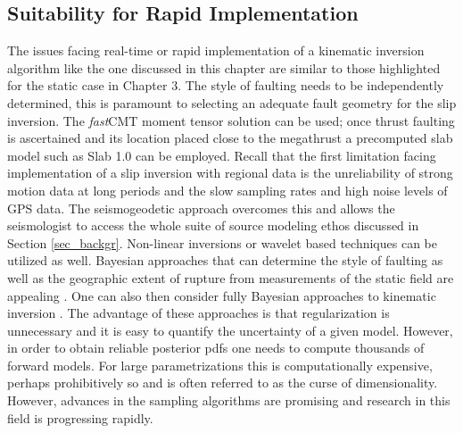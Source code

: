 \subsection{Suitability for Rapid Implementation}

The issues facing real-time or rapid implementation of a kinematic inversion algorithm like the one discussed in this chapter are similar to those highlighted for the static case in Chapter 3. The style of faulting needs to be independently determined, this is paramount to selecting an adequate fault geometry for the slip inversion. The \textit{fast}CMT moment tensor solution can be used; once thrust faulting is ascertained and its location placed close to the megathrust a precomputed slab model such as Slab 1.0 \citep{hayes2012} can be employed. Recall that the first limitation facing implementation of a slip inversion with regional data is the unreliability of strong motion data at long periods and the slow sampling rates and high noise levels of GPS data. The seismogeodetic approach overcomes this and allows the seismologist to access the whole suite of source modeling ethos discussed in Section \ref{sec_backgr}. Non-linear inversions or wavelet based techniques can be utilized as well. Bayesian approaches that can determine the style of faulting as well as the geographic extent of rupture from measurements of the static field are appealing \citep{minson2014}. One can also then consider fully Bayesian approaches to kinematic inversion \citep{simons2011,minson2013}. The advantage of these approaches is that regularization is unnecessary and it is easy to quantify the uncertainty of a given model. However, in order to obtain reliable posterior pdfs one needs to compute thousands of forward models. For large parametrizations this is computationally expensive, perhaps prohibitively so and is often referred to as the curse of dimensionality. However, advances in the sampling algorithms are promising \citep{minson2013} and research in this field is progressing rapidly.

